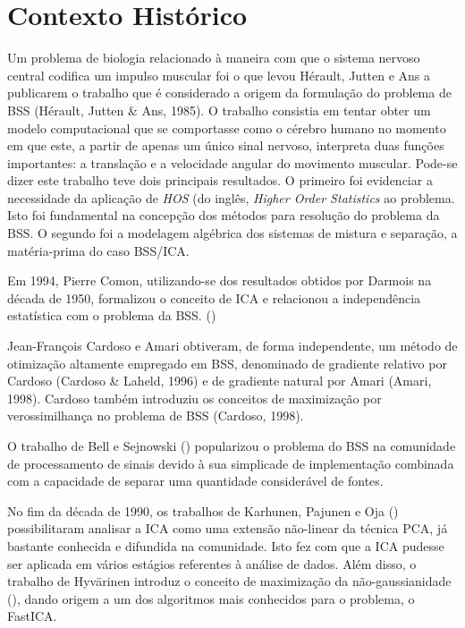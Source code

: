 \label{chap:2}

\section{Contexto Histórico}

    Um problema de biologia relacionado à maneira com que o sistema nervoso central codifica um impulso muscular foi o que levou Hérault, Jutten e Ans a publicarem o trabalho que é considerado a origem da formulação do problema de BSS (Hérault, Jutten \& Ans, 1985). O trabalho consistia em tentar obter um modelo computacional que se comportasse como o cérebro humano no momento em que este, a partir de apenas um único sinal nervoso, interpreta duas funções importantes: a translação e a velocidade angular do movimento muscular. Pode-se dizer este trabalho teve dois principais resultados. O primeiro foi evidenciar a necessidade da aplicação de \textit{HOS} (do inglês, \textit{Higher Order Statistics} ao problema. Isto foi fundamental na concepção dos métodos para resolução do problema da BSS. O segundo foi a modelagem algébrica dos sistemas de mistura e separação, a matéria-prima do caso BSS/ICA.


    Em 1994, Pierre Comon, utilizando-se dos resultados obtidos por Darmois na década de 1950, formalizou o conceito de ICA e relacionou a independência estatística com o problema da BSS. (\cite{Comon})
    
    
    Jean-François Cardoso e Amari obtiveram, de forma independente, um método de otimização altamente empregado em BSS, denominado de gradiente relativo por Cardoso (Cardoso \& Laheld, 1996) e de gradiente natural por Amari (Amari, 1998). Cardoso também introduziu os conceitos de maximização por verossimilhança no problema de BSS (Cardoso, 1998).
    
    
    O trabalho de Bell e Sejnowski (\cite{ICAML}) popularizou o problema do BSS na comunidade de processamento de sinais devido à sua simplicade de implementação combinada com a capacidade de separar uma quantidade considerável de fontes.
    
    No fim da década de 1990, os trabalhos de Karhunen, Pajunen e Oja (\cite{ICA}) possibilitaram analisar a ICA como uma extensão não-linear da técnica PCA, já bastante conhecida e difundida na comunidade. Isto fez com que a ICA pudesse ser aplicada em vários estágios referentes à análise de dados. Além disso,  o trabalho de  Hyvärinen introduz o conceito de maximização da não-gaussianidade (\cite{ICAML}), dando origem a um dos algoritmos mais conhecidos para o problema, o FastICA.
    
